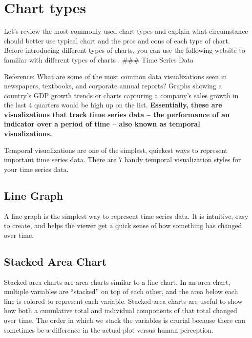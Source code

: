 \documentclass[]{book}
\theoremstyle{definition}
\theoremstyle{definition}
\theoremstyle{definition}
\theoremstyle{remark}
\begin{document}
\section{Chart types}\label{chart-types}

Let's review the most commonly used chart types and explain what
circumstance should better use typical chart and the pros and cons of
each type of chart. Before introducing different types of charts, you
can use the following website to familiar with different types of charts
\citep{charts_viz}. \#\#\# Time Series Data

Reference: \citep{aya-time-series} What are some of the most common data
visualizations seen in newspapers, textbooks, and corporate annual
reports? Graphs showing a country's GDP growth trends or charts
capturing a company's sales growth in the last 4 quarters would be high
up on the list. \textbf{Essentially, these are visualizations that track
time series data -- the performance of an indicator over a period of
time -- also known as temporal visualizations.}

Temporal visualizations are one of the simplest, quickest ways to
represent important time series data. There are 7 handy temporal
visualization styles for your time series data.

\subsection{Line Graph}\label{line-graph}

A line graph is the simplest way to represent time series data. It is
intuitive, easy to create, and helps the viewer get a quick sense of how
something has changed over time.

\subsection{Stacked Area Chart}\label{stacked-area-chart}

Stacked area charts are area charts similar to a line chart. In an area
chart, multiple variables are ``stacked'' on top of each other, and the
area below each line is colored to represent each variable. Stacked area
charts are useful to show how both a cumulative total and individual
components of that total changed over time. The order in which we stack
the variables is crucial because there can sometimes be a difference in
the actual plot versus human perception.
\end{document}
